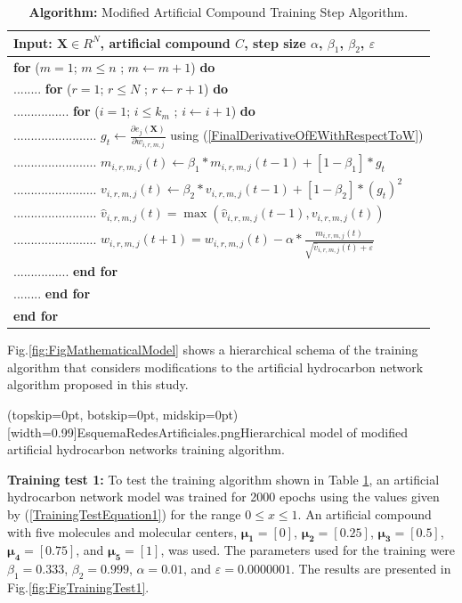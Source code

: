 \documentclass{ieeeaccess}
\begin{document}
\begin{table}[h]
 \centering
 \caption{\textbf{Algorithm:} Modified Artificial Compound Training Step Algorithm.}\label{table:Training}
 \begin{tabular}{l}
 \hline
 \textbf{Input:} \(\mathbf{X}\in R^N\), artificial compound \(C\), step size \(\alpha\), \(\beta_1\), \(\beta_2\), \(\varepsilon\) \\
 \hline
 \textbf{for} (\(m=1\); \( m\le n\) ; \(m\gets m+1\)) \textbf{do} \\
 ........ \textbf{for} (\(r=1\); \(r\le N\) ; \(r\gets r+1\)) \textbf{do} \\
 ................ \textbf{for} (\(i=1\); \(i\le k_m\) ; \(i\gets i+1\)) \textbf{do} \\
 ........................ \(g_t\gets\frac{\partial e_j(\mathbf{X})}{\partial w_{i,r,m,j}}\) using (\ref{FinalDerivativeOfEWithRespectToW}) \\
 ........................ \(m_{i,r,m,j}(t)\gets\beta_1\ast m_{i,r,m,j}(t-1)+[1-\beta_1]\ast g_t\) \\
 ........................ \(v_{i,r,m,j}(t)\gets\beta_2\ast v_{i,r,m,j}(t-1)+[1-\beta_2]\ast(g_t)^2\) \\
 ........................ \({\hat{v}}_{i,r,m,j}(t)=\max{\left({\hat{v}}_{i,r,m,j}(t-1),v_{i,r,m,j}(t)\right)}\) \\
 ........................ \(w_{i,r,m,j}\left(t+1\right)=w_{i,r,m,j}\left(t\right)-\alpha\ast\frac{m_{i,r,m,j}\left(t\right)}{\sqrt{{\hat{v}}_{i,r,m,j}\left(t\right)+\varepsilon}}\) \\
 ................ \textbf{end for} \\
 ........ \textbf{end for} \\
 \textbf{end for} \\
 \hline
 \end{tabular}
\end{table}

Fig.\ref{fig:FigMathematicalModel} shows a hierarchical schema of the training algorithm that considers modifications to the artificial hydrocarbon network algorithm proposed in this study.

\Figure[ht!](topskip=0pt, botskip=0pt, midskip=0pt)[width=0.99\columnwidth]{EsquemaRedesArtificiales.png}{Hierarchical model of modified artificial hydrocarbon networks training algorithm\label{fig:FigMathematicalModel}.}

\textbf{Training test 1:} To test the training algorithm shown in Table \ref{table:Training}, an artificial hydrocarbon network model was trained for 2000 epochs using the values given by (\ref{TrainingTestEquation1}) for the range \(0\le x\le1\). An artificial compound with five molecules and molecular centers, \(\mathbf{\mu_1}=\left[0\right]\), \(\mathbf{\mu_2}=\left[0.25\right]\), \(\mathbf{\mu_3}=\left[0.5\right]\), \(\mathbf{\mu_4}=[0.75]\), and \(\mathbf{\mu_5}=[1]\), was used. The parameters used for the training were \(\beta_1=0.333\), \(\beta_2=0.999\), \(\alpha=0.01\), and \(\varepsilon=0.0000001\). The results are presented in Fig.\ref{fig:FigTrainingTest1}.
\end{document}
